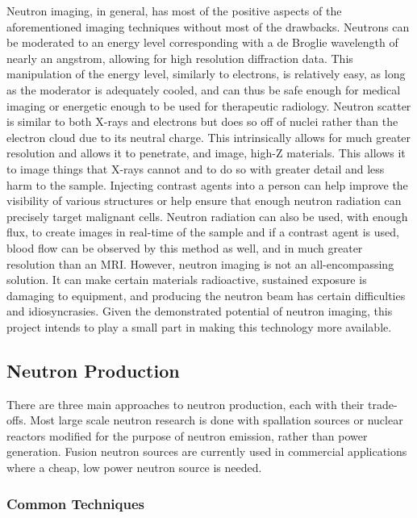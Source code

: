 Neutron imaging, in general, has most of the positive aspects of the aforementioned imaging techniques without most of the drawbacks. Neutrons can be moderated to an energy level corresponding with a de Broglie wavelength of nearly an angstrom, allowing for high resolution diffraction data. This manipulation of the energy level, similarly to electrons, is relatively easy, as long as the moderator is adequately cooled, and can thus be safe enough for medical imaging or energetic enough to be used for therapeutic radiology. Neutron scatter is similar to both X-rays and electrons but does so off of nuclei rather than the electron cloud due to its neutral charge. This intrinsically allows for much greater resolution and allows it to penetrate, and image, high-Z materials. This allows it to image things that X-rays cannot and to do so with greater detail and less harm to the sample. Injecting contrast agents into a person can help improve the visibility of various structures or help ensure that enough neutron radiation can precisely target malignant cells. Neutron radiation can also be used, with enough flux, to create images in real-time of the sample and if a contrast agent is used, blood flow can be observed by this method as well, and in much greater resolution than an MRI. However, neutron imaging is not an all-encompassing solution. It can make certain materials radioactive, sustained exposure is damaging to equipment, and producing the neutron beam has certain difficulties and idiosyncrasies. Given the demonstrated potential of neutron imaging, this project intends to play a small part in making this technology more available.

\subsection{Neutron Production}

There are three main approaches to neutron production, each with their trade-offs. Most large scale neutron research is done with spallation sources or nuclear reactors modified for the purpose of neutron emission, rather than power generation. Fusion neutron sources are currently used in commercial applications where a cheap, low power neutron source is needed.

\subsubsection{Common Techniques}

